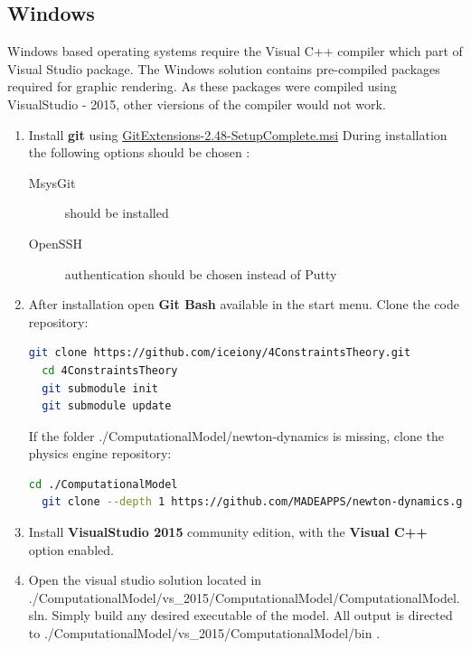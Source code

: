 \documentclass[11]{article}
\begin{document}
\subsection{Windows}
Windows based operating systems require the Visual C++ compiler which part of Visual Studio package.
The Windows solution contains pre-compiled packages required for graphic rendering. 
As these packages were compiled using VisualStudio - 2015, other viersions of the compiler would not work.   
\begin{enumerate}

  \item Install \textbf{git} using 
    \href{https://github.com/gitextensions/gitextensions/releases/latest}{GitExtensions-2.48-SetupComplete.msi} 
    During installation the following options should be chosen : 
    \begin{description}
	\item [MsysGit] should be installed 
	\item [OpenSSH] authentication should be chosen instead of Putty
    \end{description}

  \item After installation open \textbf{Git Bash} available in the start menu. Clone the code repository:   
    \begin{lstlisting}[language=bash]
  git clone https://github.com/iceiony/4ConstraintsTheory.git 
  cd 4ConstraintsTheory
  git submodule init
  git submodule update
    \end{lstlisting}

    If the folder ./ComputationalModel/newton-dynamics is missing, clone the physics engine repository:
    \begin{lstlisting}[language=bash]
  cd ./ComputationalModel
  git clone --depth 1 https://github.com/MADEAPPS/newton-dynamics.git 
    \end{lstlisting}

  \item Install \textbf{VisualStudio 2015} community edition, with the \textbf{Visual C++} option enabled. 
  
  \item Open the visual studio solution located in ./ComputationalModel/vs\_2015/ComputationalModel/ComputationalModel.sln. 
    Simply build any desired executable of the model.
    All output is directed to ./ComputationalModel/vs\_2015/ComputationalModel/bin . 

\end{enumerate}
\end{document}
